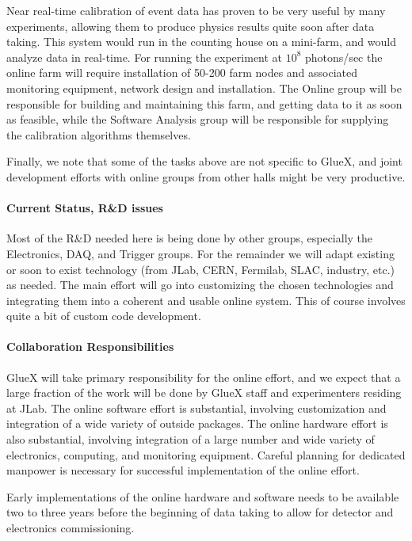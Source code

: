 \documentclass[11pt]{article}
\begin{document}
Near real-time calibration of event data has proven to be very useful
by many experiments, allowing them to produce physics results quite
soon after data taking.  This system would run in the counting house
on a mini-farm, and would analyze data in real-time.  For running the
experiment at $10^8$ photons/sec the online farm will require
installation of 50-200 farm nodes and associated monitoring equipment,
network design and installation.  The Online group will be responsible
for building and maintaining this farm, and getting data to it as soon
as feasible, while the Software Analysis group will be responsible for
supplying the calibration algorithms themselves.



Finally, we note that some of the tasks above are not specific to
GlueX, and joint development efforts with online groups from other
halls might be very productive.


\paragraph{Current Status, R\&D issues}


Most of the R\&D needed here is being done by other groups, especially
the Electronics, DAQ, and Trigger groups.  For the remainder we will
adapt existing or soon to exist technology (from JLab, CERN, Fermilab,
SLAC, industry, etc.) as needed.  The main effort will go into
customizing the chosen technologies and integrating them into a
coherent and usable online system.  This of course involves quite a
bit of custom code development.




\paragraph{Collaboration Responsibilities}


GlueX will take primary responsibility for the online effort, and we
expect that a large fraction of the work will be done by GlueX staff
and experimenters residing at JLab.  The online software effort is
substantial, involving customization and integration of a wide variety
of outside packages.  The online hardware effort is also substantial,
involving integration of a large number and wide variety of
electronics, computing, and monitoring equipment.  Careful planning
for dedicated manpower is necessary for successful implementation of
the online effort.

Early implementations of the online hardware and software needs to be available two to
three years before the beginning of data taking to allow for detector
and electronics commissioning.
\end{document}
